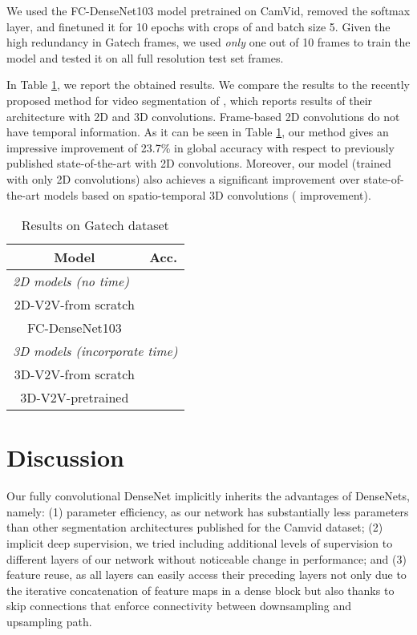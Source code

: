 \documentclass[10pt,twocolumn,letterpaper]{article}
\begin{document}
We used the FC-DenseNet103 model pretrained on CamVid, removed the softmax layer, and finetuned it for 10 epochs with crops of  and batch size 5. Given the high redundancy in Gatech frames, we used \emph{only} one out of 10 frames to train the model and tested it on all full resolution test set frames. 

In Table \ref{tab:GATECH}, we report the obtained results. We compare the results to the recently proposed method for video segmentation of \cite{Tran16v2v}, which reports results of their architecture with 2D and 3D convolutions. Frame-based 2D convolutions do not have temporal information. As it can be seen in Table \ref{tab:GATECH}, our method gives an impressive improvement of 23.7\% in global accuracy with respect to previously published state-of-the-art with 2D convolutions. Moreover, our model (trained with only 2D convolutions) also achieves a significant improvement over state-of-the-art models based on spatio-temporal 3D convolutions ( improvement). 


\begin{table}
\centering
 \begin{tabular}{c || c }
 Model & Acc. \\
 \hline \hline
 \multicolumn{2}{l}{\emph{2D models (no time)}} \\
 \hline 
 2D-V2V-from scratch \cite{Tran16v2v} & \\ \hline
  FC-DenseNet103 & \\ 
 \hline 
 \hline
 \multicolumn{2}{l}{\emph{3D models (incorporate time)}} \\
 \hline
 3D-V2V-from scratch \cite{Tran16v2v} & \\
 \hline
 3D-V2V-pretrained \cite{Tran16v2v} & \\
 \hline

 \end{tabular}
 \vspace{0.2cm}
 \caption{Results on Gatech dataset}
 \label{tab:GATECH}
\end{table}

\section{Discussion}

Our fully convolutional DenseNet implicitly inherits the advantages of DenseNets, namely: (1) parameter efficiency, as our network has substantially less parameters than other segmentation architectures published for the Camvid dataset; (2) implicit deep supervision, we tried including additional levels of supervision to different layers of our network without noticeable change in performance; and (3) feature reuse, as all layers can easily access their preceding layers not only due to the iterative concatenation of feature maps in a dense block but also thanks to skip connections that enforce connectivity between downsampling and upsampling path.
\end{document}
